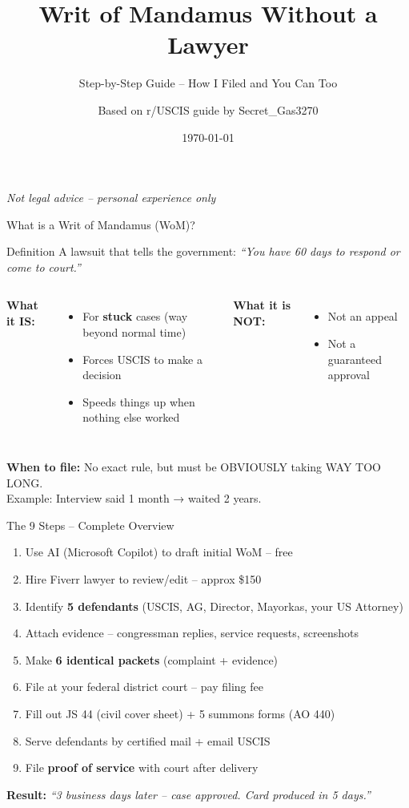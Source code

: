 \documentclass[10pt,aspectratio=169]{beamer}
\title{Writ of Mandamus Without a Lawyer}
\subtitle{Step-by-Step Guide – How I Filed and You Can Too}
\author{Based on r/USCIS guide by Secret\_Gas3270}
\date{\today}
\begin{document}
	
	\begin{frame}
		\titlepage
		\centering
		\tiny \textit{Not legal advice – personal experience only}
	\end{frame}
	
	\begin{frame}{What is a Writ of Mandamus (WoM)?}
		\begin{block}{Definition}
			A lawsuit that tells the government: \textit{“You have 60 days to respond or come to court.”}
		\end{block}
		\begin{columns}[T]
			\column{0.48\textwidth}
			\textbf{What it IS:}
			\begin{itemize}
				\item For \textbf{stuck} cases (way beyond normal time)
				\item Forces USCIS to make a decision
				\item Speeds things up when nothing else worked
			\end{itemize}
			\column{0.48\textwidth}
			\textbf{What it is NOT:}
			\begin{itemize}
				\item Not an appeal
				\item Not a guaranteed approval
			\end{itemize}
		\end{columns}
		\vspace{0.3cm}
		\textcolor{warningred}{\textbf{When to file:}} No exact rule, but must be OBVIOUSLY taking WAY TOO LONG.\\
		Example: Interview said 1 month → waited 2 years.
	\end{frame}
	
	\begin{frame}{The 9 Steps – Complete Overview}
		\begin{enumerate}
			\setlength\itemsep{0.3cm}
			\item Use AI (Microsoft Copilot) to draft initial WoM – free
			\item Hire Fiverr lawyer to review/edit – approx \$150
			\item Identify \textbf{5 defendants} (USCIS, AG, Director, Mayorkas, your US Attorney)
			\item Attach evidence – congressman replies, service requests, screenshots
			\item Make \textbf{6 identical packets} (complaint + evidence)
			\item File at your federal district court – pay filing fee
			\item Fill out JS 44 (civil cover sheet) + 5 summons forms (AO 440)
			\item Serve defendants by certified mail + email USCIS
			\item File \textbf{proof of service} with court after delivery
		\end{enumerate}
		\vspace{0.2cm}
		\centering
		\textcolor{successgreen}{\textbf{Result:}} \textit{“3 business days later – case approved. Card produced in 5 days.”}
	\end{frame}
	
\end{document}
